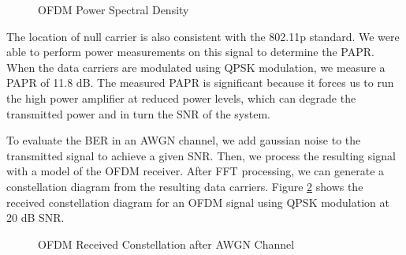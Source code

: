 \documentclass[conference]{IEEEtran}
\begin{document}
    \begin{figure}[H]
    		\centering
    		\caption{OFDM Power Spectral Density}
    		\label{fig::ofdm_psd}
	\end{figure}
    
    The location of null carrier is also consistent with the 802.11p standard. We were able to perform power measurements on this signal to determine the PAPR. When the data carriers are modulated using QPSK modulation, we measure a PAPR of 11.8 dB. The measured PAPR is significant because it forces us to run the high power amplifier at reduced power levels, which can degrade the transmitted power and in turn the SNR of the system.
    
    To evaluate the BER in an AWGN channel, we add gaussian noise to the transmitted signal to achieve a given SNR. Then, we process the resulting signal with a model of the OFDM receiver. After FFT processing, we can generate a constellation diagram from the resulting data carriers. Figure \ref{fig::rx_constellation_diagram} shows the received constellation diagram for an OFDM signal using QPSK modulation at 20 dB SNR.
      
      \begin{figure}[H]
		\centering
    		\caption{OFDM Received Constellation after AWGN Channel}
    		\label{fig::rx_constellation_diagram}
  	  \end{figure}
    
\end{document}
